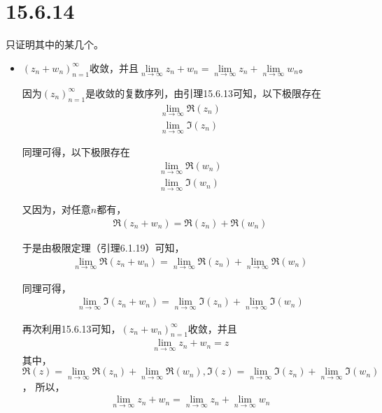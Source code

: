 \documentclass{article}
\begin{document}
\section*{15.6.14}

只证明其中的某几个。

\begin{itemize}
  \item $(z_n + w_n)_{n = 1}^\infty$收敛，并且$\lim\limits_{n \to \infty} z_n + w_n = \lim\limits_{n \to \infty} z_n + \lim\limits_{n \to \infty} w_n$。

        因为$(z_n)_{n = 1}^\infty$是收敛的复数序列，由引理15.6.13可知，以下极限存在
        \begin{align*}
          \lim\limits_{n \to \infty} \mathfrak{R}(z_n) \\
          \lim\limits_{n \to \infty} \mathfrak{I}(z_n)
        \end{align*}

        同理可得，以下极限存在
        \begin{align*}
          \lim\limits_{n \to \infty} \mathfrak{R}(w_n) \\
          \lim\limits_{n \to \infty} \mathfrak{I}(w_n)
        \end{align*}

        又因为，对任意$n$都有，
        \begin{align*}
          \mathfrak{R}(z_n + w_n) = \mathfrak{R}(z_n) + \mathfrak{R}(w_n)
        \end{align*}

        于是由极限定理（引理6.1.19）可知，
        \begin{align*}
          \lim\limits_{n \to \infty} \mathfrak{R}(z_n + w_n) = \lim\limits_{n \to \infty} \mathfrak{R}(z_n) + \lim\limits_{n \to \infty} \mathfrak{R}(w_n)
        \end{align*}

        同理可得，
        \begin{align*}
          \lim\limits_{n \to \infty} \mathfrak{I}(z_n + w_n) = \lim\limits_{n \to \infty} \mathfrak{I}(z_n) + \lim\limits_{n \to \infty} \mathfrak{I}(w_n)
        \end{align*}

        再次利用15.6.13可知，$(z_n + w_n)_{n = 1}^\infty$收敛，并且
        \begin{align*}
          \lim\limits_{n \to \infty} z_n + w_n = z
        \end{align*}
        其中，$\mathfrak{R}(z) = \lim\limits_{n \to \infty} \mathfrak{R}(z_n) + \lim\limits_{n \to \infty} \mathfrak{R}(w_n),
          \mathfrak{I}(z) = \lim\limits_{n \to \infty} \mathfrak{I}(z_n) + \lim\limits_{n \to \infty} \mathfrak{I}(w_n)$，
        所以，
        \begin{align*}
          \lim\limits_{n \to \infty} z_n + w_n = \lim\limits_{n \to \infty} z_n + \lim\limits_{n \to \infty} w_n
        \end{align*}



\end{itemize}
\end{document}
